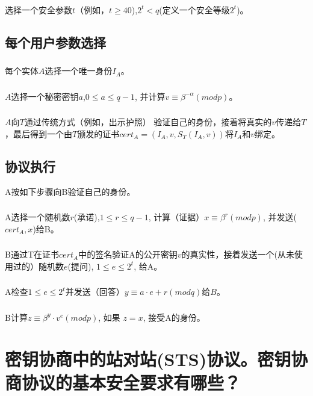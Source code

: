 \documentclass[11pt,a4paper]{article}
\begin{document}
\subsubsection{}选择一个安全参数$t$（例如，$t \ge40$),$2^t < q$(定义一个安全等级$2^t$)。

\subsection{每个用户参数选择}
\subsubsection{}每个实体$A$选择一个唯一身份$I_A$。
\subsubsection{}$A$选择一个秘密密钥$a$,$0 \le a \le q-1$, 并计算$v \equiv \beta^{-\alpha} (mod p)$。
\subsubsection{}$A$向$T$通过传统方式（例如，出示护照） 验证自己的身份，接着将真实的$v$传递给$T$，最后得到一个由$T$颁发的证书$cert_A=(I_A,v,S_T(I_A,v))$将$I_A$和$v$绑定。

\subsection{协议执行} A按如下步骤向B验证自己的身份。
\subsubsection{}A选择一个随机数$r$(承诺),$1\le r \le q-1$, 计算（证据）$x\equiv \beta^r(mod p)$, 并发送($cert_A, x$)给B。
\subsubsection{}B通过T在证书$cert_A$中的签名验证A的公开密钥$v$的真实性，接着发送一个(从未使用过的）随机数$e$(提问), $1 \le e \le 2^t$, 给A。
\subsubsection{}A检查$1\le e \le2^t$并发送（回答）$y\equiv a·e+r(mod q)给B$。
\subsubsection{}B计算$z\equiv \beta^y·v^e(mod p)$, 如果 $z=x$, 接受A的身份。
\section{密钥协商中的站对站(STS)协议。密钥协商协议的基本安全要求有哪些？}
\end{document}
